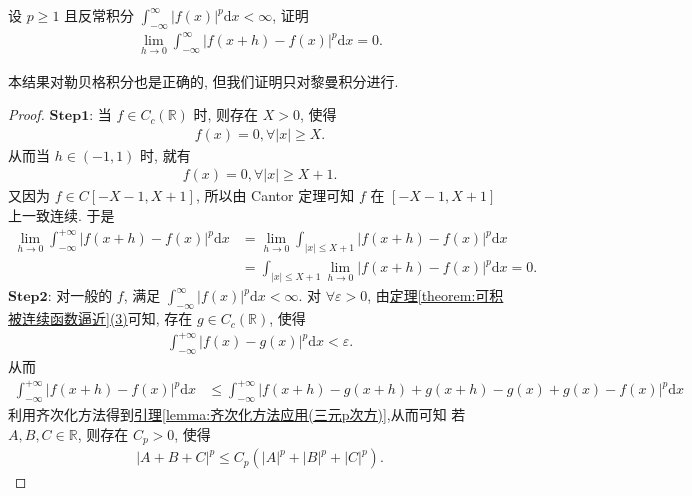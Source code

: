 \documentclass[../../main.tex]{subfiles}
\begin{document}
\begin{theorem}[积分的绝对连续性]\label{theorem:积分的绝对连续性}
设 $p \geqslant 1$ 且反常积分 $\int_{-\infty}^{\infty} |f(x)|^{p}\mathrm{d}x < \infty$, 证明
\begin{align}
\lim_{h \to 0} \int_{-\infty}^{\infty} |f(x + h) - f(x)|^{p}\mathrm{d}x = 0. \label{theorem-equation-积分的绝对连续性-13.118}
\end{align}
\end{theorem}
\begin{note}
本结果对勒贝格积分也是正确的, 但我们证明只对黎曼积分进行.
\end{note}
\begin{proof}
$\mathbf{Step}\mathbf{1}$: 当 $f\in C_c(\mathbb{R})$ 时, 则存在 $X>0$, 使得
\begin{align*}
f(x) = 0, \forall |x| \geqslant X.
\end{align*}
从而当 $h\in (-1,1)$ 时, 就有
\begin{align*}
f(x) = 0, \forall |x| \geqslant X + 1.
\end{align*}
又因为 $f\in C[-X - 1,X + 1]$, 所以由 Cantor 定理可知 $f$ 在 $[-X - 1,X + 1]$ 上一致连续. 于是
\begin{align*}
\lim_{h\rightarrow 0} \int_{-\infty}^{+\infty} |f(x + h) - f(x)|^p \mathrm{d}x &= \lim_{h\rightarrow 0} \int_{|x| \leqslant X + 1} |f(x + h) - f(x)|^p \mathrm{d}x \\
&= \int_{|x| \leqslant X + 1} \lim_{h\rightarrow 0} |f(x + h) - f(x)|^p \mathrm{d}x = 0.
\end{align*}
$\mathbf{Step}\mathbf{2}$: 对一般的 $f$, 满足 $\int_{-\infty}^{\infty} |f(x)|^p \mathrm{d}x < \infty$. 对 $\forall \varepsilon > 0$, 由\hyperref[theorem:可积被连续函数逼近]{定理\ref{theorem:可积被连续函数逼近}(3)}可知, 存在 $g\in C_c(\mathbb{R})$, 使得
\begin{align*}
\int_{-\infty}^{+\infty} |f(x) - g(x)|^p \mathrm{d}x < \varepsilon.
\end{align*}
从而
\begin{align*}
\int_{-\infty}^{+\infty} |f(x + h) - f(x)|^p \mathrm{d}x &\leqslant \int_{-\infty}^{+\infty} |f(x + h) - g(x + h) + g(x + h) - g(x) + g(x) - f(x)|^p \mathrm{d}x
\end{align*}
利用齐次化方法得到\hyperref[lemma:齐次化方法应用(三元p次方)]{引理\ref{lemma:齐次化方法应用(三元p次方)}},从而可知 若 $A,B,C\in \mathbb{R}$, 则存在 $C_p>0$, 使得
\begin{align*}
|A + B + C|^p \leqslant C_p(|A|^p + |B|^p + |C|^p).
\end{align*}

\end{proof}
\end{document}
